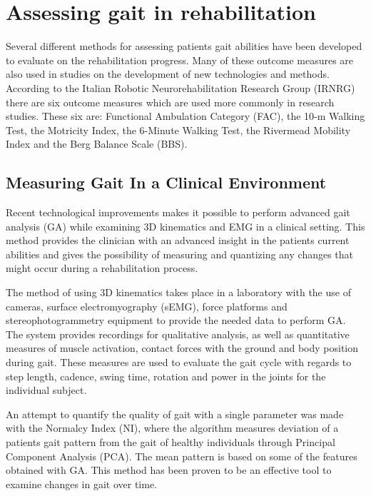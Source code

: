 \section{Assessing gait in rehabilitation}

Several different methods for assessing patients gait abilities have been developed to evaluate on the rehabilitation progress. Many of these outcome measures are also used in studies on the development of new technologies and methods. According to the Italian Robotic Neurorehabilitation Research Group (IRNRG) there are six outcome measures which are used more commonly in research studies. These six are: Functional Ambulation Category (FAC), the 10-m Walking Test, the Motricity Index, the 6-Minute Walking Test, the Rivermead Mobility Index and the Berg Balance Scale (BBS). \cite{Sandrini2018}

\subsection{Measuring Gait In a Clinical Environment}

Recent technological improvements makes it possible to perform advanced gait analysis (GA) while examining 3D kinematics and EMG in a clinical setting. This method provides the clinician with an advanced insight in the patients current abilities and gives the possibility of measuring and quantizing any changes that might occur during a rehabilitation process. \cite{Sandrini2018}

The method of using 3D kinematics takes place in a laboratory with the use of cameras, surface electromyography (sEMG), force platforms and stereophotogrammetry equipment to provide the needed data to perform GA. The system provides recordings for qualitative analysis, as well as quantitative measures of muscle activation, contact forces with the ground and body position during gait. These measures are used to evaluate the gait cycle with regards to step length, cadence, swing time, rotation and power in the joints for the individual subject. \cite{Sandrini2018}

An attempt to quantify the quality of gait with a single parameter was made with the Normalcy Index (NI), where the algorithm measures deviation of a patients gait pattern from the gait of healthy individuals through Principal Component Analysis (PCA). The mean pattern is based on some of the features obtained with GA. This method has been proven to be an effective tool to examine changes in gait over time. \cite{Sandrini2018}

